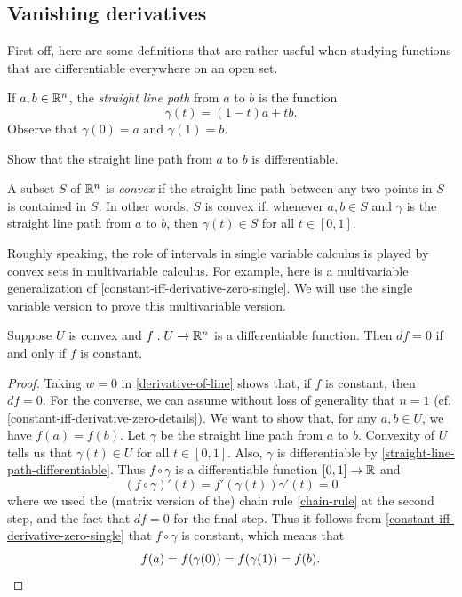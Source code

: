 \subsection{Vanishing derivatives}

First off, here are some definitions that are rather useful when studying functions that are differentiable everywhere on an open set. 

\begin{definition} \label{straight-line-path}
	If $a, b \in \mathbb{R}^n$, the \emph{straight line path} from $a$ to $b$ is the function
	\[ \gamma(t) = (1-t)a + tb. \]
	Observe that $\gamma(0) = a$ and $\gamma(1) = b$. 
\end{definition}

\begin{exercise} \label{straight-line-path-differentiable}
	Show that the straight line path from $a$ to $b$ is differentiable. 
\end{exercise}

\begin{definition} \label{convex}
	A subset $S$ of $\mathbb{R}^n$ is \emph{convex} if the straight line path between any two points in $S$ is contained in $S$. In other words, $S$ is convex if, whenever $a, b \in S$ and $\gamma$ is the straight line path from $a$ to $b$, then $\gamma(t) \in S$ for all $t \in [0,1]$. 
\end{definition}

Roughly speaking, the role of intervals in single variable calculus is played by convex sets in multivariable calculus. For example, here is a multivariable generalization of \cref{constant-iff-derivative-zero-single}. We will use the single variable version to prove this multivariable version. 

\begin{proposition} \label{constant-iff-derivative-zero}
	Suppose $U$ is convex and $f : U \to \mathbb{R}^n$ is a differentiable function. Then $df = 0$ if and only if $f$ is constant.  
\end{proposition}

\begin{proof}
	Taking $w = 0$ in \cref{derivative-of-line} shows that, if $f$ is constant, then $df = 0$. For the converse, we can assume without loss of generality that $n = 1$ (cf. \cref{constant-iff-derivative-zero-details}). We want to show that, for any $a,  b \in U$, we have $f(a) = f(b)$. Let $\gamma$ be the straight line path from $a$ to $b$. Convexity of $U$ tells us that $\gamma(t) \in U$ for all $t \in [0,1]$. Also, $\gamma$ is differentiable by \cref{straight-line-path-differentiable}. Thus $f \circ \gamma$ is a differentiable function $[0,1] \to \mathbb{R}$ and 
	\[ (f \circ \gamma)'(t) = f'(\gamma(t)) \gamma'(t) = 0 \]
	where we used the (matrix version of the) chain rule \ref{chain-rule} at the second step, and the fact that $df = 0$ for the final step. Thus it follows from \cref{constant-iff-derivative-zero-single} that $f \circ \gamma$ is constant, which means that
	\[ f(a) = f(\gamma(0)) = f(\gamma(1)) = f(b). \qedhere \]
\end{proof}

